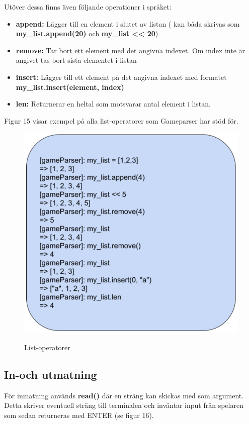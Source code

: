 \documentclass{Dokumentmall}
\begin{document}
\newpage
Utöver dessa finns även följande operationer i språket:
\begin{itemize}  
\item \textbf{append:} Lägger till en element i slutet av listan ( kan båda skrivas som \textbf{my\_list.append(20)} och \textbf{my\_list <{}< 20})

\item \textbf{remove:} Tar bort ett element med det angivna indexet. Om index inte är angivet tas bort sista elementet i listan
\item \textbf{insert:} Lägger till ett element på det angivna indexet med formatet \textbf{my\_list.insert(element, index)}

\item \textbf{len:} Returnerar en heltal som motsvarar antal element i listan.
\end{itemize}

Figur 15 visar exempel på alla list-operatorer som Gameparser har stöd för.
\begin{figure}[h!]
  \centering
  \includegraphics[scale = 0.65]{Images/Figur15.png}
  \label{}
  \caption{List-operatorer}
\end{figure}

\newpage
\subsection{In-och utmatning}
För inmatning används \textbf{read()} där en sträng kan skickas med som argument. Detta skriver eventuell sträng till terminalen och inväntar input från spelaren som sedan returneras med ENTER (se figur 16).
\end{document}
